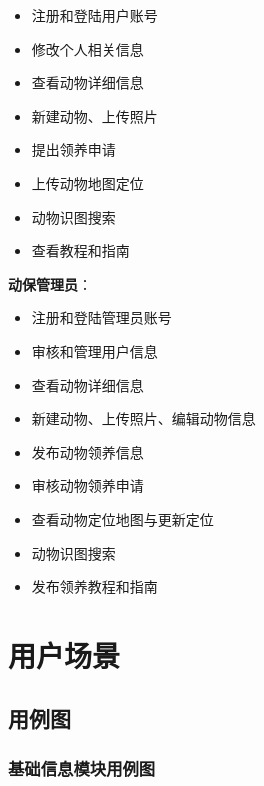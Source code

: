 \documentclass[12pt,a4paper,UTF8]{article}
\begin{document}
\begin{itemize}[topsep=2pt, partopsep=0pt]
  \item 注册和登陆用户账号
  \item 修改个人相关信息
  \item 查看动物详细信息
  \item 新建动物、上传照片
  \item 提出领养申请
  \item 上传动物地图定位
  \item 动物识图搜索
  \item 查看教程和指南
\end{itemize}

\vspace{0.25cm} %

\noindent\textbf{动保管理员}：

\begin{itemize}
  \item 注册和登陆管理员账号
  \item 审核和管理用户信息
  \item 查看动物详细信息
  \item 新建动物、上传照片、编辑动物信息
  \item 发布动物领养信息
  \item 审核动物领养申请
  \item 查看动物定位地图与更新定位
  \item 动物识图搜索
  \item 发布领养教程和指南
\end{itemize}


\section{用户场景}

\subsection{用例图}

\subsubsection{基础信息模块用例图}
\end{document}

